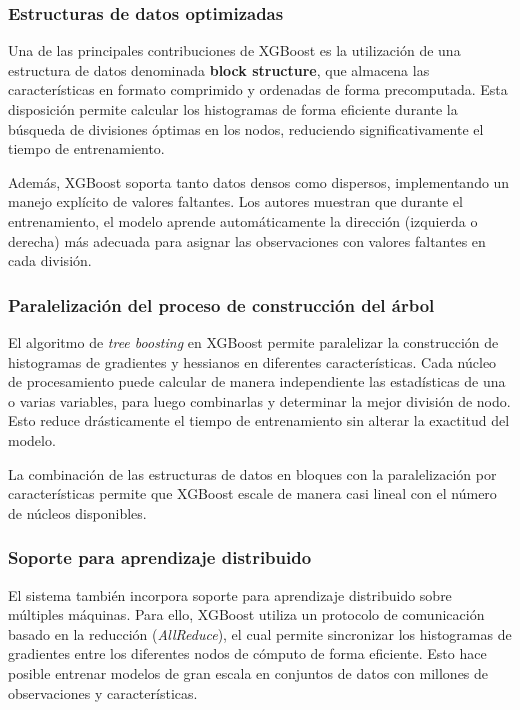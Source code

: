 \documentclass[12pt,letterpaper]{article}
\begin{document}
\subsubsection{Estructuras de datos optimizadas}
Una de las principales contribuciones de XGBoost es la utilización de una estructura de datos denominada \textbf{block structure}, que almacena las características en formato comprimido y ordenadas de forma precomputada. Esta disposición permite calcular los histogramas de forma eficiente durante la búsqueda de divisiones óptimas en los nodos, reduciendo significativamente el tiempo de entrenamiento.

Además, XGBoost soporta tanto datos densos como dispersos, implementando un manejo explícito de valores faltantes. Los autores muestran que durante el entrenamiento, el modelo aprende automáticamente la dirección (izquierda o derecha) más adecuada para asignar las observaciones con valores faltantes en cada división.

\subsubsection{Paralelización del proceso de construcción del árbol}
El algoritmo de \textit{tree boosting} en XGBoost permite paralelizar la construcción de histogramas de gradientes y hessianos en diferentes características. Cada núcleo de procesamiento puede calcular de manera independiente las estadísticas de una o varias variables, para luego combinarlas y determinar la mejor división de nodo. Esto reduce drásticamente el tiempo de entrenamiento sin alterar la exactitud del modelo.

La combinación de las estructuras de datos en bloques con la paralelización por características permite que XGBoost escale de manera casi lineal con el número de núcleos disponibles.

\subsubsection{Soporte para aprendizaje distribuido}
El sistema también incorpora soporte para aprendizaje distribuido sobre múltiples máquinas. Para ello, XGBoost utiliza un protocolo de comunicación basado en la reducción (\textit{AllReduce}), el cual permite sincronizar los histogramas de gradientes entre los diferentes nodos de cómputo de forma eficiente. Esto hace posible entrenar modelos de gran escala en conjuntos de datos con millones de observaciones y características.
\end{document}
